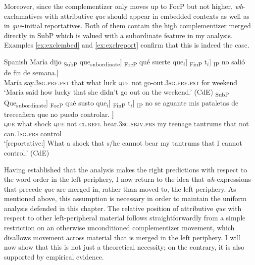 Moreover, since the complementizer  only moves  up to FocP but not higher,  \textit{wh}-exclamatives with attributive \emph{que} should appear in embedded contexts as well as in \emph{que}-initial reportatives. Both of them contain  the high complementizer merged directly in SubP  which is valued  with a subordinate feature in my analysis. Examples \eqref{ex:exclembed} and \eqref{ex:exclreport} confirm that this is indeed the case.

\ea Spanish
\ea\label{ex:exclembed}
		 \gll María dijo {\ob}\textsubscript{SubP} que\textsubscript{subordinate}] {\ob}\textsubscript{FocP} qué suerte que$_i$] {\ob}\textsubscript{FinP} t$_i$] {\ob}\textsubscript{IP} no salió de {fin de semana}.] \\ 
María say.\textsc{3sg.prf.pst} {} that {} what luck \textsc{que} {} {} {} not go-out.\textsc{3sg.prf.pst} for weekend\\ 
\glt `María said how lucky that she didn't go out on the weekend.' (CdE)
\ex \label{ex:exclreport} 
\gll   {\ob}\textsubscript{SubP} Que\textsubscript{subordinate}] {\ob}\textsubscript{FocP} qué susto que$_i$] {\ob}\textsubscript{FinP} t$_i$] {\ob}\textsubscript{IP}   no se aguante mis {pataletas de treceañera} que no puedo controlar. ] \\
{} \textsc{que} {} what shock \textsc{que} {} {} {} not \textsc{cl.refl} bear.\textsc{3sg.sbjv.prs} my {teenage tantrums} that not can.\textsc{1sg.prs} control\\
\glt `[reportative:] What a shock that s/he cannot bear my tantrums that I cannot control.' (CdE)
\z
\z 



 
Having established that the analysis makes the right predictions with respect to the word order in the left periphery, I now return to the idea that \textit{wh}-ex\-pres\-sions that precede \emph{que} are merged in,  rather than moved to, the left periphery. As mentioned above, this assumption is necessary  in order to maintain the uniform analysis defended in this chapter. The relative position of attributive \emph{que} with respect to other left-peripheral material follows straightforwardly from a simple restriction on an otherwise unconditioned complementizer movement, which disallows movement across material that is merged in the left periphery. I will now show that this is not just a theoretical necessity; on the contrary, it is also supported by empirical evidence. 

